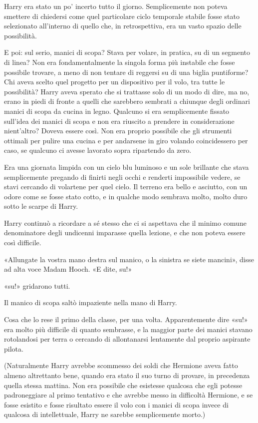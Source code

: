 Harry era stato un po’ incerto tutto il giorno. Semplicemente non poteva smettere di chiedersi come quel particolare ciclo temporale stabile fosse stato selezionato all’interno di quello che, in retrospettiva, era un vasto spazio delle possibilità.

E poi: sul serio, manici di scopa? Stava per volare, in pratica, su di un segmento di linea? Non era fondamentalmente la singola forma più instabile che fosse possibile trovare, a meno di non tentare di reggersi su di una biglia puntiforme? Chi aveva scelto quel progetto per un dispositivo per il volo, tra tutte le possibilità? Harry aveva sperato che si trattasse solo di un modo di dire, ma no, erano in piedi di fronte a quelli che sarebbero sembrati a chiunque degli ordinari manici di scopa da cucina in legno. Qualcuno si era semplicemente fissato sull’idea dei manici di scopa e non era riuscito a prendere in considerazione nient’altro? Doveva essere così. Non era proprio possibile che gli strumenti ottimali per pulire una cucina e per andarsene in giro volando coincidessero per caso, se qualcuno ci avesse lavorato sopra ripartendo da zero.

Era una giornata limpida con un cielo blu luminoso e un sole brillante che stava semplicemente pregando di finirti negli occhi e renderti impossibile vedere, se stavi cercando di volartene per quel cielo. Il terreno era bello e asciutto, con un odore come se fosse stato cotto, e in qualche modo sembrava molto, molto duro sotto le scarpe di Harry.

Harry continuò a ricordare a sé stesso che ci si aspettava che il minimo comune denominatore degli undicenni imparasse quella lezione, e che non poteva essere così difficile.

«Allungate la vostra mano destra sul manico, o la sinistra se siete mancini», disse ad alta voce Madam Hooch. «E dite, su!»

«su!» gridarono tutti.

Il manico di scopa saltò impaziente nella mano di Harry.

Cosa che lo rese il primo della classe, per una volta. Apparentemente dire «su!» era molto più difficile di quanto sembrasse, e la maggior parte dei manici stavano rotolandosi per terra o cercando di allontanarsi lentamente dal proprio aspirante pilota.

(Naturalmente Harry avrebbe scommesso dei soldi che Hermione aveva fatto almeno altrettanto bene, quando era stato il suo turno di provare, in precedenza quella stessa mattina. Non era possibile che esistesse qualcosa che egli potesse padroneggiare al primo tentativo e che avrebbe messo in difficoltà Hermione, e se fosse esistito e fosse risultato essere il volo con i manici di scopa invece di qualcosa di intellettuale, Harry ne sarebbe semplicemente morto.)

